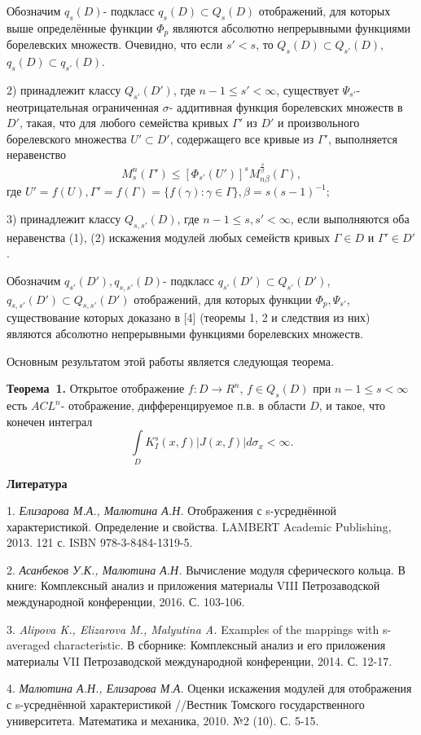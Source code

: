 Обозначим $q_{s}(D)$- подкласс $q_{s}(D)\subset Q_{s}(D)$ отображений, для которых выше определённые функции $\Phi_{p}$ являются абсолютно непрерывными функциями борелевских множеств. Очевидно, что если $s'<s$, то $Q_{s}(D)\subset Q_{s'}(D)$, $q_{s}(D)\subset q_{s'}(D)$.

2) принадлежит классу $Q_{s'}(D')$, где $n-1\leqslant s'<\infty$, существует $\Psi_{s'}$- неотрицательная ограниченная $\sigma$- аддитивная функция борелевских множеств в $D'$, такая, что для любого семейства кривых $\Gamma'$ из $D'$ и произвольного борелевского множества $U'\subset D'$, содержащего все кривые из $\Gamma'$, выполняется неравенство
\begin{equation}\label{eq-2}
M_{s}^{n}(\Gamma')\leqslant[\Phi_{s'}(U')]^{s}M^{\frac{s}{\beta}}_{n\beta}(\Gamma),
\end{equation}
где $U'=f(U),\Gamma'=f(\Gamma)=\{f(\gamma):\gamma\in\Gamma\},\beta=s(s-1)^{-1}$;

3) принадлежит классу $Q_{s,s'}(D)$, где $n-1\leqslant s,s'<\infty$, если выполняются оба неравенства (1), (2) искажения модулей любых семейств кривых $\Gamma\in D$ и $\Gamma'\in D'$.

Обозначим $q_{s'}(D'),q_{s,s'}(D)$- подкласс $q_{s'}(D')\subset Q_{s'}(D')$, $q_{s,s'}(D')\subset Q_{s,s'}(D')$ отображений, для которых функции $\Phi_{p},\Psi_{s'}$, существование которых доказано в [4] (теоремы 1, 2 и следствия из них) являются абсолютно непрерывными функциями борелевских множеств.

Основным результатом этой работы является следующая теорема.


\textbf{Теорема~1.} Открытое отображение $f:D\rightarrow R^{n}$, $f\in Q_{s}(D)$ при $n-1\leqslant s<\infty$ есть $ACL^{n}$- отображение, дифференцируемое п.в. в области $D$, и такое, что конечен интеграл
\begin{equation*}
\int\limits_{D}K^{s}_{I}(x,f)|J(x,f)|d\sigma_{x}<\infty.
\end{equation*}


\smallskip \centerline{\bf Литература}\nopagebreak

1. {\it Елизарова М.А., Малютина А.Н. } Отображения с s-усреднённой характеристикой. Определение и свойства. LAMBERT Academic Publishing, 2013. 121 с. ISBN 978-3-8484-1319-5.


2. {\it Асанбеков У.К., Малютина А.Н. } Вычисление модуля сферического кольца. В книге: Комплексный анализ и приложения материалы VIII Петрозаводской международной конференции, 2016. С. 103-106.

3. {\it	Alipova K., Elizarova M., Malyutina A. } Examples of the mappings with s-averaged characteristic. В сборнике: Комплексный анализ и его приложения материалы VII Петрозаводской международной конференции, 2014. С. 12-17.

4. {\it	Малютина А.Н., Елизарова М.А. } Оценки искажения модулей для отображения с s-усреднённой характеристикой //Вестник Томского государственного университета. Математика и механика, 2010. №2 (10). С. 5-15.

